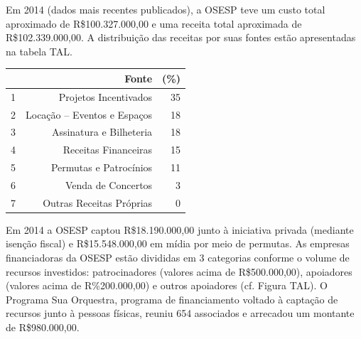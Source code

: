 \documentclass[a4paper, 12pt, openright, oneside, german, french, english, brazil]{abntex2}
\begin{document}
	Em 2014 (dados mais recentes publicados), a OSESP teve um custo total aproximado de R\$100.327.000,00 e uma receita total aproximada de R\$102.339.000,00. A distribuição das receitas por suas fontes estão apresentadas na tabela TAL.
	
	\begin{table}[ht]
		{\begin{tabular}{rrr}
				\hline
				& Fonte & (\%)\\
				\hline
				1 & Projetos Incentivados & 35 \\
				2 & Locação -- Eventos e Espaços & 18 \\
				3 & Assinatura e Bilheteria & 18 \\
				4 & Receitas Financeiras & 15 \\
				5 & Permutas e Patrocínios & 11 \\
				6 & Venda de Concertos & 3 \\
				7 & Outras Receitas Próprias & 0 \\
				\hline
			\end{tabular}
		}
		{}
	\end{table}
	
	Em 2014 a OSESP captou R\$18.190.000,00 junto à iniciativa privada (mediante isenção fiscal) e R\$15.548.000,00 em mídia por meio de permutas. As empresas financiadoras da OSESP estão divididas em 3 categorias conforme o volume de recursos investidos: patrocinadores (valores acima de R\$500.000,00), apoiadores (valores acima de R\%200.000,00)  e outros apoiadores (cf. Figura TAL). O Programa Sua Orquestra, programa de financiamento voltado à captação de recursos junto à pessoas físicas, reuniu 654 associados e arrecadou um montante de R\$980.000,00.
	
\end{document}
